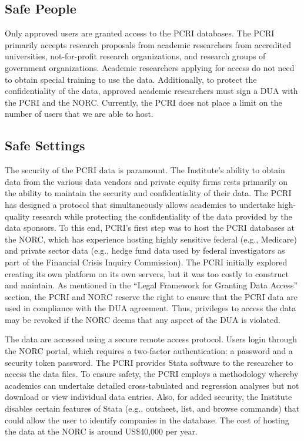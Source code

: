 \hypertarget{safe-people-2}{%
\subsection{Safe People}\label{safe-people-2}}

Only approved users are granted access to the PCRI databases. The PCRI primarily accepts research proposals from academic researchers from accredited universities, not-for-profit research organizations, and research groups of government organizations. Academic researchers applying for access do not need to obtain special training to use the data. Additionally, to protect the confidentiality of the data, approved academic researchers must sign a DUA with the PCRI and the NORC. Currently, the PCRI does not place a limit on the number of users that we are able to host.

\hypertarget{safe-settings-2}{%
\subsection{Safe Settings}\label{safe-settings-2}}

The security of the PCRI data is paramount. The Institute's ability to obtain data from the various data vendors and private equity firms rests primarily on the ability to maintain the security and confidentiality of their data. The PCRI has designed a protocol that simultaneously allows academics to undertake high-quality research while protecting the confidentiality of the data provided by the data sponsors. To this end, PCRI's first step was to host the PCRI databases at the NORC, which has experience hosting highly sensitive federal (e.g., Medicare) and private sector data (e.g., hedge fund data used by federal investigators as part of the Financial Crisis Inquiry Commission). The PCRI initially explored creating its own platform on its own servers, but it was too costly to construct and maintain. As mentioned in the ``Legal Framework for Granting Data Access'' section, the PCRI and NORC reserve the right to ensure that the PCRI data are used in compliance with the DUA agreement. Thus, privileges to access the data may be revoked if the NORC deems that any aspect of the DUA is violated.

The data are accessed using a secure remote access protocol. Users login through the NORC portal, which requires a two-factor authentication: a password and a security token password. The PCRI provides Stata software to the researcher to access the data files. To ensure safety, the PCRI employs a methodology whereby academics can undertake detailed cross-tabulated and regression analyses but not download or view individual data entries. Also, for added security, the Institute disables certain features of Stata (e.g., outsheet, list, and browse commands) that could allow the user to identify companies in the database. The cost of hosting the data at the NORC is around US\$40,000 per year.

